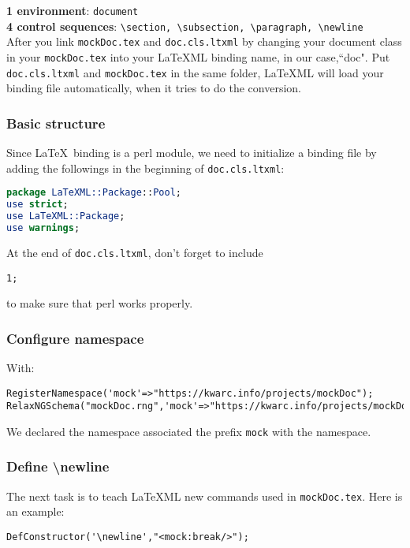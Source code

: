 \documentclass[a4paper]{article}
\begin{document}
\textbf{1 environment}: \texttt{document}\\
\indent \textbf{4 control sequences}: \texttt{\textbackslash section, \textbackslash subsection, \textbackslash paragraph, \textbackslash newline}\\

\noindent After you link \texttt{mockDoc.tex} and \texttt{doc.cls.ltxml} by changing your document class in your \texttt{mockDoc.tex} into your \LaTeX ML binding name, in our case,``doc". Put \texttt{doc.cls.ltxml} and \texttt{mockDoc.tex} in the same folder, \LaTeX ML will load your binding file automatically, when it tries to do the conversion.\\

\subsubsection{Basic structure}
\noindent Since \LaTeX\ binding is a perl module, we need to initialize a binding file by adding the followings in the beginning of \texttt{doc.cls.ltxml}: 
\begin{lstlisting}[language=Perl]
package LaTeXML::Package::Pool;
use strict;
use LaTeXML::Package;
use warnings;
\end{lstlisting}
At the end of \texttt{doc.cls.ltxml}, don't forget to include
\begin{lstlisting}
1;
\end{lstlisting}
to make sure that perl works properly.\\

\subsubsection{Configure namespace}
\noindent With:
\begin{lstlisting}
RegisterNamespace('mock'=>"https://kwarc.info/projects/mockDoc");
RelaxNGSchema("mockDoc.rng",'mock'=>"https://kwarc.info/projects/mockDoc");
\end{lstlisting}
We declared the namespace associated the prefix \texttt{mock} with the namespace.\\

\subsubsection{Define \textbackslash newline}
\noindent The next task is to teach \LaTeX ML new commands used in \texttt{mockDoc.tex}. Here is an example:
\begin{lstlisting}
DefConstructor('\newline',"<mock:break/>");
\end{lstlisting}
\end{document}
